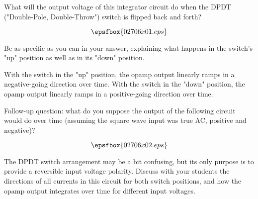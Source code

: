 

What will the output voltage of this integrator circuit do when the DPDT ("Double-Pole, Double-Throw") switch is flipped back and forth?

$$\epsfbox{02706x01.eps}$$

Be as specific as you can in your answer, explaining what happens in the switch's "up" position as well as in its "down" position.







With the switch in the "up" position, the opamp output linearly ramps in a negative-going direction over time.  With the switch in the "down" position, the opamp output linearly ramps in a positive-going direction over time.

\vskip 10pt

Follow-up question: what do you suppose the output of the following circuit would do over time (assuming the square wave input was true AC, positive and negative)?

$$\epsfbox{02706x02.eps}$$







The DPDT switch arrangement may be a bit confusing, but its only purpose is to provide a reversible input voltage polarity.  Discuss with your students the directions of all currents in this circuit for both switch positions, and how the opamp output integrates over time for different input voltages.




